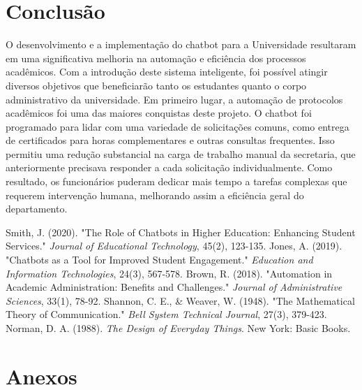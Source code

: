 \documentclass[12pt,a4paper]{article} %
\begin{document}
\section{Conclusão}

\noindent O desenvolvimento e a implementação do chatbot para a Universidade resultaram em uma significativa melhoria na automação e eficiência dos processos acadêmicos. Com a introdução deste sistema inteligente, foi possível atingir diversos objetivos que beneficiarão tanto os estudantes quanto o corpo administrativo da universidade.
Em primeiro lugar, a automação de protocolos acadêmicos foi uma das maiores conquistas deste projeto. O chatbot foi programado para lidar com uma variedade de solicitações comuns, como entrega de certificados para horas complementares e outras consultas frequentes. Isso permitiu uma redução substancial na carga de trabalho manual da secretaria, que anteriormente precisava responder a cada solicitação individualmente. Como resultado, os funcionários puderam dedicar mais tempo a tarefas complexas que requerem intervenção humana, melhorando assim a eficiência geral do departamento.



\newpage

\begin{thebibliography}{99}
 Smith, J. (2020). "The Role of Chatbots in Higher Education: Enhancing Student Services." \textit{Journal of Educational Technology}, 45(2), 123-135.
 Jones, A. (2019). "Chatbots as a Tool for Improved Student Engagement." \textit{Education and Information Technologies}, 24(3), 567-578.
 Brown, R. (2018). "Automation in Academic Administration: Benefits and Challenges." \textit{Journal of Administrative Sciences}, 33(1), 78-92.
 Shannon, C. E., \& Weaver, W. (1948). "The Mathematical Theory of Communication." \textit{Bell System Technical Journal}, 27(3), 379-423.
 Norman, D. A. (1988). \textit{The Design of Everyday Things}. New York: Basic Books.
\end{thebibliography}

\newpage

\appendix
\section{Anexos}

\end{document}
